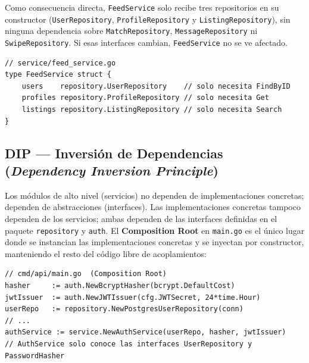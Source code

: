 \documentclass[12pt,a4paper]{article}
\begin{document}
Como consecuencia directa, \texttt{FeedService} solo recibe tres repositorios en su constructor
(\texttt{UserRepository}, \texttt{ProfileRepository} y \texttt{ListingRepository}), sin ninguna
dependencia sobre \texttt{MatchRepository}, \texttt{MessageRepository} ni
\texttt{SwipeRepository}. Si esas interfaces cambian, \texttt{FeedService} no se ve afectado.

\begin{lstlisting}[style=gostyle]
// service/feed_service.go
type FeedService struct {
    users    repository.UserRepository    // solo necesita FindByID
    profiles repository.ProfileRepository // solo necesita Get
    listings repository.ListingRepository // solo necesita Search
}
\end{lstlisting}

\subsection{DIP --- Inversión de Dependencias (\textit{Dependency Inversion Principle})}

Los módulos de alto nivel (servicios) no dependen de implementaciones concretas; dependen de
abstracciones (interfaces). Las implementaciones concretas tampoco dependen de los servicios; ambas dependen de las interfaces definidas en el paquete \texttt{repository} y \texttt{auth}. El \textbf{Composition Root} en \texttt{main.go} es el único lugar donde se instancian las
implementaciones concretas y se inyectan por constructor, manteniendo el resto del código libre
de acoplamientos:

\begin{lstlisting}[style=gostyle]
// cmd/api/main.go  (Composition Root)
hasher     := auth.NewBcryptHasher(bcrypt.DefaultCost)
jwtIssuer  := auth.NewJWTIssuer(cfg.JWTSecret, 24*time.Hour)
userRepo   := repository.NewPostgresUserRepository(conn)
// ...
authService := service.NewAuthService(userRepo, hasher, jwtIssuer)
// AuthService solo conoce las interfaces UserRepository y PasswordHasher
\end{lstlisting}
\end{document}
